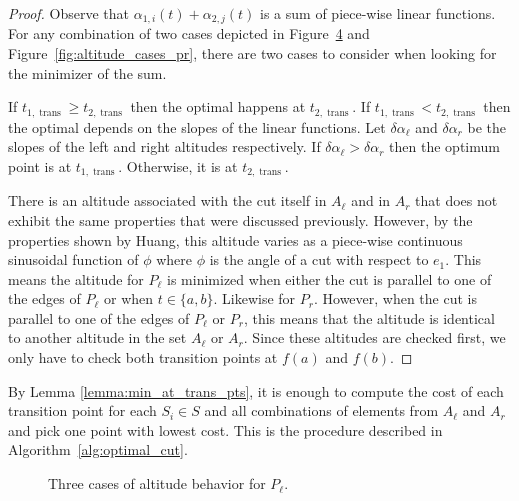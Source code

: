 \documentclass[../main.tex]{subfiles}
\begin{document}
\begin{proof}
Observe that $\alpha_{1,i}(t)+\alpha_{2,j}(t)$ is a sum of piece-wise linear functions.  For any combination of two cases depicted in Figure~\ref{fig:altitude_cases_pl} and Figure~\ref{fig:altitude_cases_pr}, there are two cases to consider when looking for the minimizer of the sum.

If $t_{1,\operatorname{trans}}\geq t_{2,\operatorname{trans}}$ then the optimal happens at $t_{2,\operatorname{trans}}$. If $t_{1,\operatorname{trans}}<t_{2,\operatorname{trans}}$ then the optimal depends on the slopes of the linear functions. Let $\delta\alpha_{\ell}$ and $\delta\alpha_r$ be the slopes of the left and right altitudes respectively. If $\delta\alpha_{\ell}>\delta\alpha_r$ then the optimum point is at $t_{1,\operatorname{trans}}$. Otherwise, it is at $t_{2,\operatorname{trans}}$.

There is an altitude associated with the cut itself in $A_{\ell}$ and in $A_r$ that does not exhibit the same properties that were discussed previously. However, by the properties shown by Huang\cite{Huang2001optimal}, this altitude varies as a piece-wise continuous sinusoidal function of $\phi$ where $\phi$ is the angle of a cut with respect to $e_1$. This means the altitude for $P_{\ell}$ is minimized when either the cut is parallel to one of the edges of $P_{\ell}$ or when $t\in\{a,b\}$. Likewise for $P_r$. However, when the cut is parallel to one of the edges of $P_{\ell}$ or $P_r$, this means that the altitude is identical to another altitude in the set $A_{\ell}$ or $A_r$. Since these altitudes are checked first, we only have to check both transition points at $f(a)$ and $f(b)$.
\end{proof}

By Lemma \ref{lemma:min_at_trans_pts}, it is enough to compute the cost of each transition point for each $S_i\in S$ and all combinations of elements from $A_{\ell}$ and $A_r$ and pick one point with lowest cost. This is the procedure described in Algorithm~\ref{alg:optimal_cut}.

\begin{figure}
	\centering
	\begin{subfigure}{0.45\linewidth}
		\centering
		
		\caption{\label{fig:altitude_case_i}}
	\end{subfigure}%
	\quad
	\begin{subfigure}{0.45\linewidth}
		\centering
		
		\caption{\label{fig:altitude_case_ii}}
	\end{subfigure}
	\begin{subfigure}{0.45\linewidth}
		\centering
		
		\caption{\label{fig:altitude_case_iii}}
	\end{subfigure}
	\caption{Three cases of altitude behavior for $P_{\ell}$.}
	\label{fig:altitude_cases_pl}
\end{figure}
\end{document}
